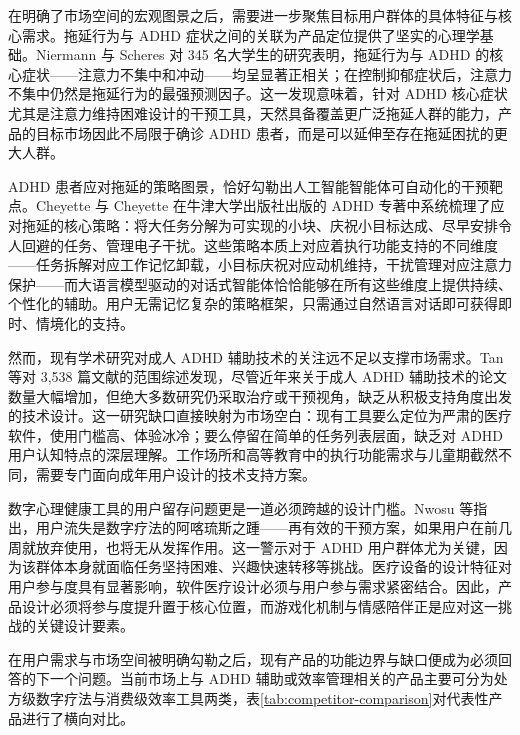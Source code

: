 \par 在明确了市场空间的宏观图景之后，需要进一步聚焦目标用户群体的具体特征与核心需求。拖延行为与 ADHD 症状之间的关联为产品定位提供了坚实的心理学基础。Niermann 与 Scheres 对 345 名大学生的研究表明，拖延行为与 ADHD 的核心症状——注意力不集中和冲动——均呈显著正相关；在控制抑郁症状后，注意力不集中仍然是拖延行为的最强预测因子\cite{niermann2014relation}。这一发现意味着，针对 ADHD 核心症状尤其是注意力维持困难设计的干预工具，天然具备覆盖更广泛拖延人群的能力，产品的目标市场因此不局限于确诊 ADHD 患者，而是可以延伸至存在拖延困扰的更大人群。

\par ADHD 患者应对拖延的策略图景，恰好勾勒出人工智能智能体可自动化的干预靶点。Cheyette 与 Cheyette 在牛津大学出版社出版的 ADHD 专著中系统梳理了应对拖延的核心策略：将大任务分解为可实现的小块、庆祝小目标达成、尽早安排令人回避的任务、管理电子干扰\cite{cheyette2025procrastination}。这些策略本质上对应着执行功能支持的不同维度——任务拆解对应工作记忆卸载，小目标庆祝对应动机维持，干扰管理对应注意力保护——而大语言模型驱动的对话式智能体恰恰能够在所有这些维度上提供持续、个性化的辅助。用户无需记忆复杂的策略框架，只需通过自然语言对话即可获得即时、情境化的支持。

\par 然而，现有学术研究对成人 ADHD 辅助技术的关注远不足以支撑市场需求。Tan 等对 3,538 篇文献的范围综述发现，尽管近年来关于成人 ADHD 辅助技术的论文数量大幅增加，但绝大多数研究仍采取治疗或干预视角，缺乏从积极支持角度出发的技术设计\cite{tan2026preliminary}。这一研究缺口直接映射为市场空白：现有工具要么定位为严肃的医疗软件，使用门槛高、体验冰冷；要么停留在简单的任务列表层面，缺乏对 ADHD 用户认知特点的深层理解。工作场所和高等教育中的执行功能需求与儿童期截然不同，需要专门面向成年用户设计的技术支持方案。

\par 数字心理健康工具的用户留存问题更是一道必须跨越的设计门槛。Nwosu 等指出，用户流失是数字疗法的阿喀琉斯之踵——再有效的干预方案，如果用户在前几周就放弃使用，也将无从发挥作用\cite{nwosu2022digital}。这一警示对于 ADHD 用户群体尤为关键，因为该群体本身就面临任务坚持困难、兴趣快速转移等挑战。医疗设备的设计特征对用户参与度具有显著影响，软件医疗设计必须与用户参与需求紧密结合。因此，产品设计必须将参与度提升置于核心位置，而游戏化机制与情感陪伴正是应对这一挑战的关键设计要素。

\par 在用户需求与市场空间被明确勾勒之后，现有产品的功能边界与缺口便成为必须回答的下一个问题。当前市场上与 ADHD 辅助或效率管理相关的产品主要可分为处方级数字疗法与消费级效率工具两类，表\ref{tab:competitor-comparison}对代表性产品进行了横向对比。

